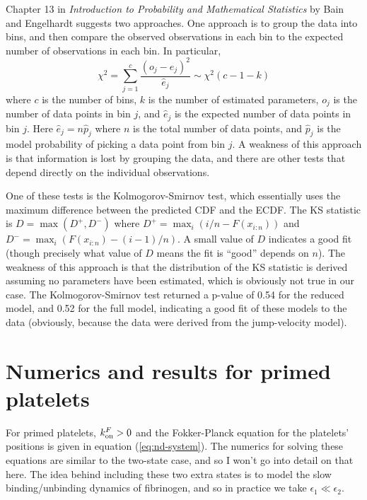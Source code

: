 \documentclass{article}
\newcommand{\tn}{\textnormal}
\begin{document}
Chapter 13 in \textit{Introduction to Probability and Mathematical
  Statistics} by Bain and Engelhardt suggests two approaches. One
approach is to group the data into bins, and then compare the observed
observations in each bin to the expected number of observations in
each bin. In particular,
\begin{equation}
  \label{eq:chi2}
  \chi^2 = \sum_{j=1}^c \frac{(o_j - \hat{e}_j)^2}{\hat{e}_j} \sim
  \chi^2(c - 1 - k)
\end{equation}
where $c$ is the number of bins, $k$ is the number of estimated
parameters, $o_j$ is the number of data points in bin $j$, and
$\hat{e}_j$ is the expected number of data points in bin $j$. Here
$\hat{e}_j = n \hat{p}_j$ where $n$ is the total number of data
points, and $\hat{p}_j$ is the model probability of picking a data
point from bin $j$. A weakness of this approach is that information is
lost by grouping the data, and there are other tests that depend
directly on the individual observations.

One of these tests is the Kolmogorov-Smirnov test, which essentially
uses the maximum difference between the predicted CDF and the
ECDF. The KS statistic is $D = \max(D^+, D^-)$ where
$D^+ = \max_i(i/n - F(x_{i:n}))$ and
$D^- = \max_i(F(x_{i:n}) - (i - 1)/n)$. A small value of $D$ indicates
a good fit (though precisely what value of $D$ means the fit is
``good'' depends on $n$). The weakness of this approach is that the
distribution of the KS statistic is derived assuming no parameters
have been estimated, which is obviously not true in our case. The
Kolmogorov-Smirnov test returned a p-value of 0.54 for the reduced
model, and 0.52 for the full model, indicating a good fit of these
models to the data (obviously, because the data were derived from the
jump-velocity model).

\section{Numerics and results for primed platelets}
\label{sec:numer-results-prim}

For primed platelets, $k_\tn{on}^F > 0$ and the Fokker-Planck equation
for the platelets' positions is given in equation
(\ref{eq:nd-system}). The numerics for solving these equations are
similar to the two-state case, and so I won't go into detail on that
here. The idea behind including these two extra states is to model the
slow binding/unbinding dynamics of fibrinogen, and so in practice we
take $\epsilon_1 \ll \epsilon_2$.
\end{document}
